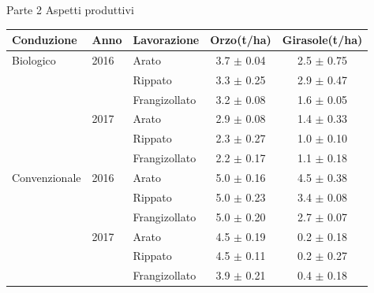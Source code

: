 \documentclass[10pt]{beamer}
\begin{document}
\begin{frame}{Parte 2 \small{Aspetti produttivi}}

  \vspace{0.5cm}
  \footnotesize{
    \begin{table}[ht]
      \centering
      \begin{tabular}{lllcc}
        \hline
        Conduzione   & Anno & Lavorazione   & Orzo(t/ha)      & Girasole(t/ha) \\ 
        \hline
        Biologico    & 2016 & Arato         & 3.7 $\pm$ 0.04  & 2.5 $\pm$ 0.75 \\ 
                     &      & Rippato       & 3.3 $\pm$ 0.25  & 2.9 $\pm$ 0.47 \\ 
                     &      & Frangizollato & 3.2 $\pm$ 0.08  & 1.6 $\pm$ 0.05 \\ 
                     & 2017 & Arato         & 2.9 $\pm$ 0.08  & 1.4 $\pm$ 0.33 \\ 
                     &      & Rippato       & 2.3 $\pm$ 0.27  & 1.0 $\pm$ 0.10 \\ 
                     &      & Frangizollato & 2.2 $\pm$ 0.17  & 1.1 $\pm$ 0.18 \\ 
        Convenzionale& 2016 & Arato         & 5.0 $\pm$ 0.16  & 4.5 $\pm$ 0.38 \\ 
                     &      & Rippato       & 5.0 $\pm$ 0.23  & 3.4 $\pm$ 0.08 \\ 
                     &      & Frangizollato & 5.0 $\pm$ 0.20  & 2.7 $\pm$ 0.07 \\ 
                     & 2017 & Arato         & 4.5 $\pm$ 0.19  & 0.2 $\pm$ 0.18 \\ 
                     &      & Rippato       & 4.5 $\pm$ 0.11  & 0.2 $\pm$ 0.27 \\ 
                     &      & Frangizollato & 3.9 $\pm$ 0.21  & 0.4 $\pm$ 0.18 \\ 
        \hline
      \end{tabular}
    \end{table}}

\end{frame}
\end{document}
